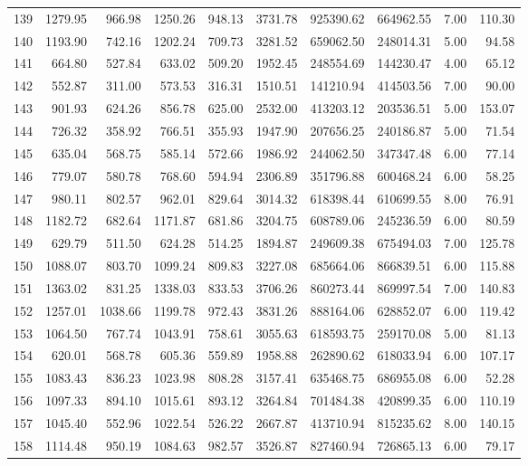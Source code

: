 \begin{tabular}{lrrrrrrrrr}
139 & 1279.95 & 966.98 & 1250.26 & 948.13 & 3731.78 & 925390.62 & 664962.55 & 7.00 & 110.30 \\
140 & 1193.90 & 742.16 & 1202.24 & 709.73 & 3281.52 & 659062.50 & 248014.31 & 5.00 & 94.58 \\
141 & 664.80 & 527.84 & 633.02 & 509.20 & 1952.45 & 248554.69 & 144230.47 & 4.00 & 65.12 \\
142 & 552.87 & 311.00 & 573.53 & 316.31 & 1510.51 & 141210.94 & 414503.56 & 7.00 & 90.00 \\
143 & 901.93 & 624.26 & 856.78 & 625.00 & 2532.00 & 413203.12 & 203536.51 & 5.00 & 153.07 \\
144 & 726.32 & 358.92 & 766.51 & 355.93 & 1947.90 & 207656.25 & 240186.87 & 5.00 & 71.54 \\
145 & 635.04 & 568.75 & 585.14 & 572.66 & 1986.92 & 244062.50 & 347347.48 & 6.00 & 77.14 \\
146 & 779.07 & 580.78 & 768.60 & 594.94 & 2306.89 & 351796.88 & 600468.24 & 6.00 & 58.25 \\
147 & 980.11 & 802.57 & 962.01 & 829.64 & 3014.32 & 618398.44 & 610699.55 & 8.00 & 76.91 \\
148 & 1182.72 & 682.64 & 1171.87 & 681.86 & 3204.75 & 608789.06 & 245236.59 & 6.00 & 80.59 \\
149 & 629.79 & 511.50 & 624.28 & 514.25 & 1894.87 & 249609.38 & 675494.03 & 7.00 & 125.78 \\
150 & 1088.07 & 803.70 & 1099.24 & 809.83 & 3227.08 & 685664.06 & 866839.51 & 6.00 & 115.88 \\
151 & 1363.02 & 831.25 & 1338.03 & 833.53 & 3706.26 & 860273.44 & 869997.54 & 7.00 & 140.83 \\
152 & 1257.01 & 1038.66 & 1199.78 & 972.43 & 3831.26 & 888164.06 & 628852.07 & 6.00 & 119.42 \\
153 & 1064.50 & 767.74 & 1043.91 & 758.61 & 3055.63 & 618593.75 & 259170.08 & 5.00 & 81.13 \\
154 & 620.01 & 568.78 & 605.36 & 559.89 & 1958.88 & 262890.62 & 618033.94 & 6.00 & 107.17 \\
155 & 1083.43 & 836.23 & 1023.98 & 808.28 & 3157.41 & 635468.75 & 686955.08 & 6.00 & 52.28 \\
156 & 1097.33 & 894.10 & 1015.61 & 893.12 & 3264.84 & 701484.38 & 420899.35 & 6.00 & 110.19 \\
157 & 1045.40 & 552.96 & 1022.54 & 526.22 & 2667.87 & 413710.94 & 815235.62 & 8.00 & 140.15 \\
158 & 1114.48 & 950.19 & 1084.63 & 982.57 & 3526.87 & 827460.94 & 726865.13 & 6.00 & 79.17 \\

\end{tabular}
